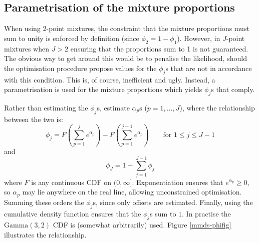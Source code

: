 \documentclass[10pt]{article}
\begin{document}
\subsection*{Parametrisation of the mixture proportions}

When using 2-point mixtures, the constraint that the mixture proportions must sum to unity is enforced by definition (since $\phi_2=1-\phi_1$). However, in $J$-point mixtures when $J>2$ ensuring that the proportions sum to 1 is not guaranteed. The obvious way to get around this would be to penalise the likelihood, should the optimisation procedure propose values for the $\phi_j$s that are not in accordance with this condition. This is, of course, inefficient and ugly. Instead, a parametrisation is used for the mixture proportions which yields $\phi_j$s that comply.

Rather than estimating the $\phi_j$s, estimate $\alpha_p$s ($p=1,\ldots,J$), where the relationship between the two is:
\begin{equation*}
\phi_j = F(\sum_{p=1}^j e^{\alpha_p}) - F(\sum_{p=1}^{j-1} e^{\alpha_p}) \qquad \text{for } 1\leq j \leq J-1
\end{equation*}
and
\begin{equation*}
\phi_J = 1-\sum_{j=1}^{J-1} \phi_j
\end{equation*}
where $F$ is any continuous CDF on $(0,\infty]$. Exponentiation ensures that $e^{\alpha_p}\geq0$, so $\alpha_p$ may lie anywhere on the real line, allowing unconstrained optimisation. Summing these orders the $\phi_j$s, since only offsets are estimated. Finally, using the cumulative density function ensures that the $\phi_j$s sum to $1$. In practise the $\text{Gamma}(3,2)$ CDF is (somewhat arbitrarily) used. Figure \ref{mmds-phifig} illustrates the relationship.
\end{document}
